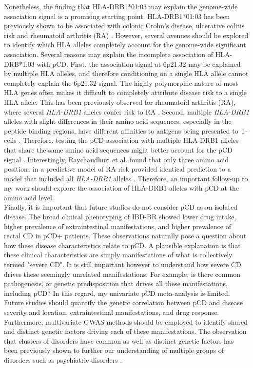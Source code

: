   Nonetheless, the finding that HLA-DRB1*01:03 may explain the genome-wide association signal is a promising starting point. HLA-DRB1*01:03 has been previously shown to be associated with colonic Crohn's disease, ulcerative colitis risk \cite{Goyette2015-xx,Cleynen2016-ha} and rheumatoid arthritis (RA) \cite{Klimenta2019-be}. However, several avenues should be explored to identify which HLA alleles completely account for the genome-wide significant association. Several reasons may explain the incomplete association of HLA-DRB*1:03 with pCD. First, the association signal at 6p21.32 may be explained by multiple HLA alleles, and therefore conditioning on a single HLA allele cannot completely explain the 6p21.32 signal. The highly polymorphic nature of most HLA genes often makes it difficult to completely attribute disease risk to a single HLA allele. This has been previously observed for rheumatoid arthritis (RA), where several \textit{HLA-DRB1} alleles confer risk to RA \cite{Van_Drongelen2017-dh}. Second, multiple \textit{HLA-DRB1} alleles with slight differences in their amino acid sequences, especially in the peptide binding regions, have different affinities to antigens being presented to T-cells \cite{Wang2022-hk}. Therefore, testing the pCD association with multiple HLA-DRB1 alleles that share the same amino acid sequences might better account for the pCD signal \cite{Molineros2019-mu}. Interestingly, Raychaudhuri et al. found that only three amino acid positions in a predictive model of RA risk provided identical prediction to a model that included all \textit{HLA-DRB1} alleles \cite{Raychaudhuri2012-em}. Therefore, an important follow-up to my work should explore the association of HLA-DRB1 alleles with pCD at the amino acid level. \\

Finally, it is important that future studies do not consider pCD as an isolated disease. The broad clinical phenotyping of IBD-BR showed lower drug intake, higher prevalence of extraintestinal manifestations, and higher prevalence of rectal CD in pCD+ patients. These observations naturally pose a question about how these disease characteristics relate to pCD. A plausible explanation is that these clinical characteristics are simply manifestations of what is collectively termed "severe CD". It is still important however to understand how severe CD drives these seemingly unrelated manifestations. For example, is there common pathogenesis, or genetic predisposition that drives all these manifestations, including pCD? In this regard, my univariate pCD meta-analysis is limited. Future studies should quantify the genetic correlation between pCD and disease severity and location, extraintestinal manifestations, and drug response. Furthermore, multivariate GWAS methods should be employed to identify shared and distinct genetic factors driving each of these manifestations. The observation that clusters of disorders have common as well as distinct genetic factors has been previously shown to further our understanding of multiple groups of disorders such as psychiatric disorders \cite{Grotzinger2019-bt}. \\





